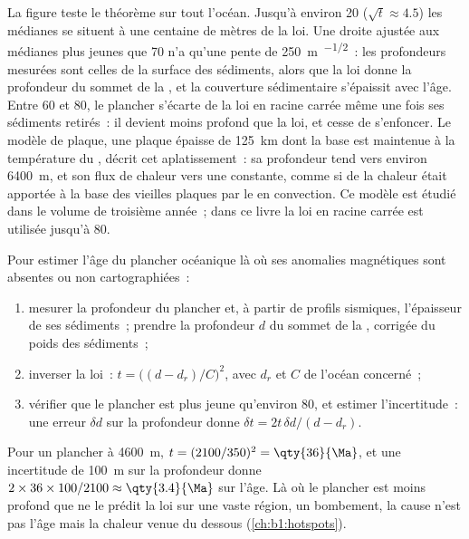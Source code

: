 La figure teste le théorème sur tout l'océan. Jusqu'à environ
\qty{20}{\Ma} ($\sqrt t \approx 4.5$) les médianes se situent à une centaine de
mètres de la loi. Une droite ajustée aux médianes plus jeunes
que \qty{70}{\Ma} n'a qu'une pente de \qty{250}{m.\Ma^{-1/2}}~: les profondeurs mesurées
sont celles de la surface des sédiments, alors que la loi donne la profondeur du
sommet de la , et la couverture sédimentaire s'épaissit avec l'âge. Entre 60 et
\qty{80}{\Ma}, le plancher s'écarte de la loi en racine carrée même une fois ses
sédiments retirés~: il devient moins profond que la loi, et cesse de s'enfoncer.
Le modèle de plaque, une plaque épaisse de \qty{125}{km} dont la base est maintenue à la
température du , décrit cet aplatissement~: sa profondeur tend vers environ
\qty{6400}{m}, et son flux de chaleur vers une constante, comme si de la chaleur était apportée à la
base des vieilles plaques par le  en convection. Ce modèle est étudié dans le
volume de troisième année~; dans ce livre la loi en racine carrée est utilisée jusqu'à \qty{80}{\Ma}.

\begin{method}\label{met:b1:rifts-ridges-margins:age-from-depth}
Pour estimer l'âge du plancher océanique là où ses anomalies magnétiques sont absentes ou
non cartographiées~:
\begin{enumerate}
  \item mesurer la profondeur du plancher et, à partir de profils sismiques,
        l'épaisseur de ses sédiments~; prendre la profondeur $d$ du sommet de la ,
        corrigée du poids des sédiments~;
  \item inverser la loi~: $t = \bigl((d - d_r)/C\bigr)^2$, avec $d_r$ et $C$ de
        l'océan concerné~;
  \item vérifier que le plancher est plus jeune qu'environ \qty{80}{\Ma}, et estimer
        l'incertitude~: une erreur $\delta d$ sur la profondeur donne
        $\delta t = 2t\,\delta d/(d - d_r)$.
\end{enumerate}
\end{method}

Pour un plancher à \qty{4600}{m}, $t = (2100/350)^2 = \qty{36}{\Ma}$, et une
incertitude de \qty{100}{m} sur la profondeur donne $2\times36\times100/2100 \approx
\qty{3.4}{\Ma}$ sur l'âge. Là où le plancher est moins profond que ne le prédit la loi sur
une vaste région, un bombement, la cause n'est pas l'âge mais la chaleur venue du dessous
(\cref{ch:b1:hotspots}).

